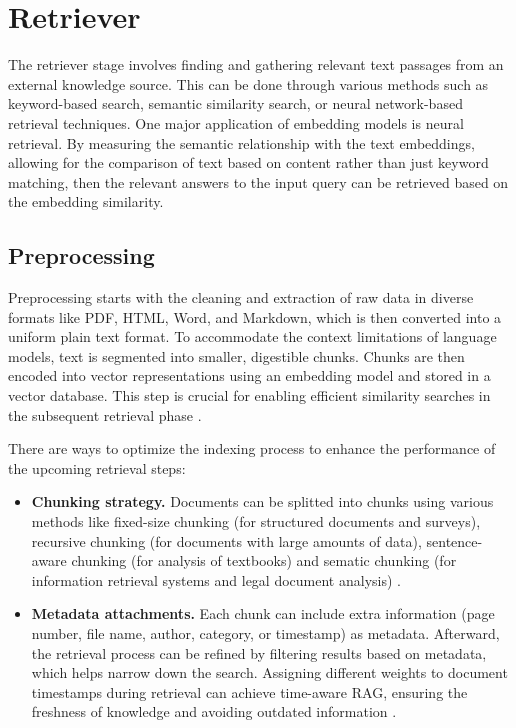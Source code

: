 \section{Retriever}

The retriever stage involves finding and gathering relevant text passages from an external knowledge source. This can be done through various methods such as keyword-based search, semantic similarity search, or neural network-based retrieval techniques.
One major application of embedding models is neural retrieval. By measuring the semantic relationship with the text embeddings, allowing for the comparison of text based on content rather than just keyword matching, then the relevant answers to the input query can be retrieved based on the embedding similarity.

\subsection{Preprocessing}
Preprocessing starts with the cleaning and extraction of raw data in diverse formats like PDF, HTML, Word, and Markdown, which is then converted into a uniform plain text format. To accommodate the context limitations of language models, text is segmented into smaller, digestible chunks. Chunks are then encoded into vector representations using an embedding model and stored in a vector database. This step is crucial for enabling efficient similarity searches in the subsequent retrieval phase \cite{gao2023ragllmsurvey}.

There are ways to optimize the indexing process to enhance the performance of the upcoming retrieval steps:
\begin{itemize}
    \item \textbf{Chunking strategy.} Documents can be splitted into chunks using various methods like fixed-size chunking (for structured documents and surveys), recursive chunking (for documents with large amounts of data), sentence-aware chunking (for analysis of textbooks) and sematic chunking (for information retrieval systems and legal document analysis) \cite{kshirsagar2024chunking}.
    \item \textbf{Metadata attachments.} Each chunk can include extra information (page number, file name, author, category, or timestamp) as metadata. Afterward, the retrieval process can be refined by filtering results based on metadata, which helps narrow down the search. Assigning different weights to document timestamps during retrieval can achieve time-aware RAG, ensuring the freshness of knowledge and avoiding outdated information \cite{gao2023ragllmsurvey}.
\end{itemize}

